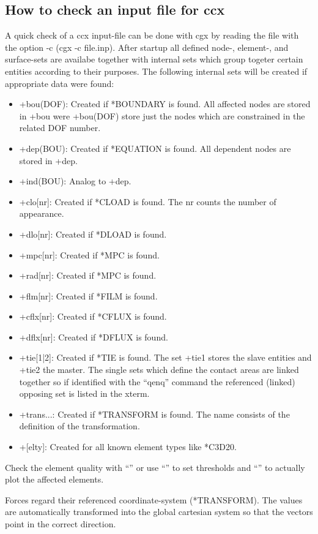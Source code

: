\documentclass{article}
\begin{document}
\begin{appendix}
\subsection{\label{How to check an input file for ccx}How to check an input file for ccx}
A quick check of a ccx input-file can be done with cgx by reading the file with the option -c (cgx -c file.inp). After startup all defined node-, element-, and surface-sets are availabe together with internal sets which group togeter certain entities according to their purposes. The following internal sets will be created if appropriate data were found: 
\begin{itemize}
\item +bou(DOF):  Created if *BOUNDARY is found. All affected nodes are stored in +bou were +bou(DOF) store just the nodes which are constrained in the related DOF number.
\item +dep(BOU):  Created if *EQUATION is found. All dependent nodes are stored in +dep.
\item +ind(BOU):  Analog to +dep.
\item +clo[nr]:   Created if *CLOAD is found. The nr counts the number of appearance.
\item +dlo[nr]:   Created if *DLOAD is found.
\item +mpc[nr]:   Created if *MPC is found.
\item +rad[nr]:   Created if *MPC is found.
\item +flm[nr]:   Created if *FILM is found.
\item +cflx[nr]:  Created if *CFLUX is found.
\item +dflx[nr]:  Created if *DFLUX is found.
\item +tie[1|2]:  Created if *TIE is found. The set +tie1 stores the slave entities and +tie2 the master. The single sets which define the contact areas are linked together so if identified with the ``qenq'' command the referenced (linked) opposing set is listed in the xterm.
\item +trans...:  Created if *TRANSFORM is found. The name consists of the definition of the transformation.
\item +[elty]:    Created for all known element types like *C3D20.
\end{itemize}
Check the element quality with ``'' or use ``'' to set thresholds and ``'' to actually plot the affected elements.

Forces regard their referenced coordinate-system (*TRANSFORM). The values are automatically transformed into the global cartesian system so that the vectors point in the correct direction.


\end{appendix}
\end{document}
